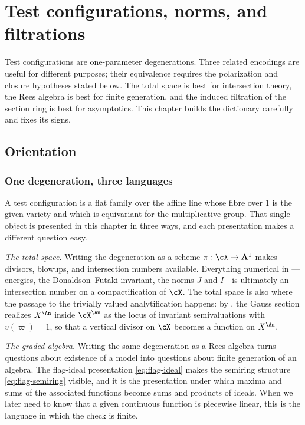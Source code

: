 \chapter{Test configurations, norms, and filtrations}
\label{chap:bj-test-configurations}

Test configurations are one-parameter degenerations.  Three related
encodings are useful for different purposes; their equivalence requires
the polarization and closure hypotheses stated below.  The total space is
best for
intersection theory, the Rees algebra is best for finite generation, and the
induced filtration of the section ring is best for asymptotics.  This chapter
builds the dictionary carefully and fixes its signs.

\section{Orientation}
\label{sec:ch33-orientation}

\subsection{One degeneration, three languages}
\label{sec:ch33-three-languages}

A test configuration is a flat family over the affine line whose fibre over
$1$ is the given variety and which is equivariant for the multiplicative
group.  That single object is presented in this chapter in three ways, and
each presentation makes a different question easy.

\emph{The total space.}  Writing the degeneration as a scheme
$\pi:\cX\to\mathbf A^1$ makes divisors, blowups, and intersection numbers
available.  Everything numerical in
---energies, the
Donaldson--Futaki invariant, the norms $J$ and $I$---is ultimately an
intersection number on a compactification of $\cX$.  The total space is
also where the passage to the trivially valued analytification happens: by
, the Gauss section realizes
$X^{\An}$ inside $\cX^{\An}$ as the locus of invariant semivaluations
with $v(\varpi)=1$, so that a vertical divisor on $\cX$ becomes a
function on $X^{\An}$.

\emph{The graded algebra.}  Writing the same degeneration as a Rees algebra
turns questions about existence of a model into questions about finite
generation of an algebra.  The flag-ideal presentation
\eqref{eq:flag-ideal} makes the semiring structure
\eqref{eq:flag-semiring} visible, and it is the presentation under which
maxima and sums of the associated functions become sums and products of
ideals.  When we later need to know that a given continuous function is
piecewise linear, this is the language in which the check is finite.

